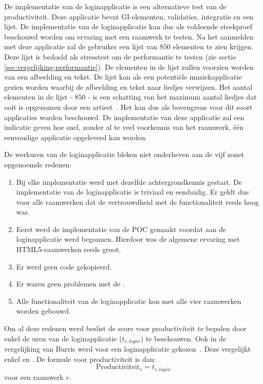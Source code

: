 De implementatie van de loginapplicatie is een alternatieve test van de productiviteit.
Deze applicatie bevat GI-elementen, validaties,   integratie en een lijst.
De implementatie van de loginapplicatie kan dus als voldoende steekproef beschouwd worden om ervaring met een raamwerk te testen.
Na het aanmelden met deze applicatie zal de gebruiker een lijst van $850$ elementen te zien krijgen.
Deze lijst is bedoeld als stresstest om de performantie te testen (zie sectie \ref{sec:vergelijking-performantie}).
De elementen in de lijst zullen voorzien worden van een afbeelding en tekst.
De lijst kan als een potentiële muziekapplicatie gezien worden waarbij de afbeelding en tekst naar liedjes verwijzen.
Het aantal elementen in de lijst - $850$ - is een schatting van het maximum aantal liedjes dat ooit is opgenomen door een artiest~\cite{Zimmy2011}.
Het kan dus als bovengrens voor dit soort applicaties worden beschouwd.
De implementatie van deze applicatie zal een indicatie geven hoe snel,  zonder al te veel voorkennis van het raamwerk,  één eenvoudige applicatie opgeleverd kan worden.

De werkuren van de loginapplicatie bleken niet onderheven aan de vijf zonet opgenoemde redenen:
\begin{enumerate}
\item Bij elke implementatie werd met dezelfde achtergrondkennis gestart.  
De implementatie van de loginapplicatie is triviaal en eenduidig.
Er geldt dus voor alle raamwerken dat de vertrouwdheid met de functionaliteit reeds hoog was.
\item Eerst werd de implementatie van de POC gemaakt voordat aan de loginapplicatie werd begonnen.
Hierdoor was de algemene ervaring met HTML5-raamwerken reeds groot.
\item Er werd geen code gekopieerd. 
\item Er waren geen problemen met de .
\item Alle functionaliteit van de loginapplicatie kon met alle vier raamwerken worden gebouwd.
\end{enumerate}
Om al deze redenen werd beslist de score voor productiviteit te bepalen door enkel de uren van de loginapplicatie ($t_{r,login}$) te beschouwen.
Ook in de vergelijking van Burris werd voor een loginapplicatie gekozen~\cite{Burris}.
Deze vergelijkt enkel \st{} en \jqm{}.
De formule voor productiviteit is dan:
\begin{equation}
  \text{Productiviteit}_r = t_{r,login}
  \label{eq:productiviteit-enhanced}
\end{equation}
voor een raamwerk $r$.

